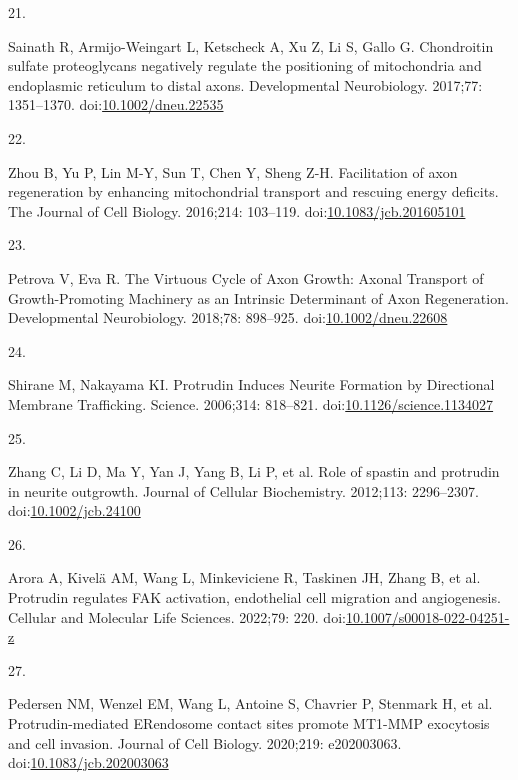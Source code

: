 \documentclass[
  12pt,
  a4paper,
]{article}
\newlength{\cslhangindent}
\newlength{\csllabelwidth}
\newlength{\cslentryspacingunit} %
\newenvironment{CSLReferences}[2] %
 {%
  \setlength{\parindent}{0pt}
  \ifodd #1
  \let\oldpar\par
  \def\par{\hangindent=\cslhangindent\oldpar}
  \fi
  \setlength{\parskip}{#2\cslentryspacingunit}
 }%
 {}
\newcommand{\CSLLeftMargin}[1]{\parbox[t]{\csllabelwidth}{#1}}
\newcommand{\CSLRightInline}[1]{\parbox[t]{\linewidth - \csllabelwidth}{#1}\break}
\begin{document}
\begin{CSLReferences}{0}{0}
\leavevmode{}%
\CSLLeftMargin{21. }%
\CSLRightInline{Sainath R, Armijo-Weingart L, Ketscheck A, Xu Z, Li S,
Gallo G. Chondroitin sulfate proteoglycans negatively regulate the
positioning of mitochondria and endoplasmic reticulum to distal axons.
Developmental Neurobiology. 2017;77: 1351--1370.
doi:\href{https://doi.org/10.1002/dneu.22535}{10.1002/dneu.22535}}

\leavevmode{}%
\CSLLeftMargin{22. }%
\CSLRightInline{Zhou B, Yu P, Lin M-Y, Sun T, Chen Y, Sheng Z-H.
Facilitation of axon regeneration by enhancing mitochondrial transport
and rescuing energy deficits. The Journal of Cell Biology. 2016;214:
103--119.
doi:\href{https://doi.org/10.1083/jcb.201605101}{10.1083/jcb.201605101}}

\leavevmode{}%
\CSLLeftMargin{23. }%
\CSLRightInline{Petrova V, Eva R. The {Virtuous Cycle} of {Axon Growth}:
{Axonal Transport} of {Growth-Promoting Machinery} as an {Intrinsic
Determinant} of {Axon Regeneration}. Developmental Neurobiology.
2018;78: 898--925.
doi:\href{https://doi.org/10.1002/dneu.22608}{10.1002/dneu.22608}}

\leavevmode{}%
\CSLLeftMargin{24. }%
\CSLRightInline{Shirane M, Nakayama KI. Protrudin {Induces Neurite
Formation} by {Directional Membrane Trafficking}. Science. 2006;314:
818--821.
doi:\href{https://doi.org/10.1126/science.1134027}{10.1126/science.1134027}}

\leavevmode{}%
\CSLLeftMargin{25. }%
\CSLRightInline{Zhang C, Li D, Ma Y, Yan J, Yang B, Li P, et al. Role of
spastin and protrudin in neurite outgrowth. Journal of Cellular
Biochemistry. 2012;113: 2296--2307.
doi:\href{https://doi.org/10.1002/jcb.24100}{10.1002/jcb.24100}}

\leavevmode{}%
\CSLLeftMargin{26. }%
\CSLRightInline{Arora A, Kivelä AM, Wang L, Minkeviciene R, Taskinen JH,
Zhang B, et al. Protrudin regulates {FAK} activation, endothelial cell
migration and angiogenesis. Cellular and Molecular Life Sciences.
2022;79: 220.
doi:\href{https://doi.org/10.1007/s00018-022-04251-z}{10.1007/s00018-022-04251-z}}

\leavevmode{}%
\CSLLeftMargin{27. }%
\CSLRightInline{Pedersen NM, Wenzel EM, Wang L, Antoine S, Chavrier P,
Stenmark H, et al. Protrudin-mediated {ER}\textendash endosome contact
sites promote {MT1-MMP} exocytosis and cell invasion. Journal of Cell
Biology. 2020;219: e202003063.
doi:\href{https://doi.org/10.1083/jcb.202003063}{10.1083/jcb.202003063}}


\end{CSLReferences}
\end{document}
